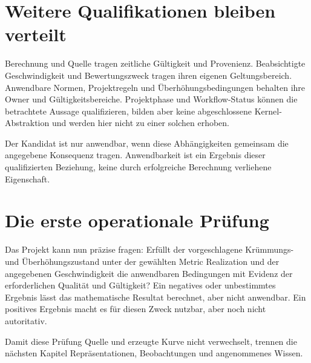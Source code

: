 \section{Weitere Qualifikationen bleiben verteilt}

Berechnung und Quelle tragen zeitliche Gültigkeit und Provenienz. Beabsichtigte
Geschwindigkeit und Bewertungszweck tragen ihren eigenen Geltungsbereich.
Anwendbare Normen, Projektregeln und Überhöhungsbedingungen behalten ihre Owner
und Gültigkeitsbereiche. Projektphase und Workflow-Status können die betrachtete
Aussage qualifizieren, bilden aber keine abgeschlossene Kernel-Abstraktion und
werden hier nicht zu einer solchen erhoben.

Der Kandidat ist nur anwendbar, wenn diese Abhängigkeiten gemeinsam die
angegebene Konsequenz tragen. Anwendbarkeit ist ein Ergebnis dieser
qualifizierten Beziehung, keine durch erfolgreiche Berechnung verliehene
Eigenschaft.

\section{Die erste operationale Prüfung}

Das Projekt kann nun präzise fragen: Erfüllt der vorgeschlagene Krümmungs- und
Überhöhungszustand unter der gewählten Metric Realization und der angegebenen
Geschwindigkeit die anwendbaren Bedingungen mit Evidenz der erforderlichen
Qualität und Gültigkeit? Ein negatives oder unbestimmtes Ergebnis lässt das
mathematische Resultat berechnet, aber nicht anwendbar. Ein positives Ergebnis
macht es für diesen Zweck nutzbar, aber noch nicht autoritativ.

Damit diese Prüfung Quelle und erzeugte Kurve nicht verwechselt, trennen die
nächsten Kapitel Repräsentationen, Beobachtungen und angenommenes Wissen.
